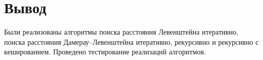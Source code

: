 \section*{Вывод}

Были реализованы алгоритмы поиска расстояния Левенштейна итеративно, поиска расстояния Дамерау–Левенштейна итеративно, рекурсивно и рекурсивно с кешированием. Проведено тестирование реализаций алгоритмов.
